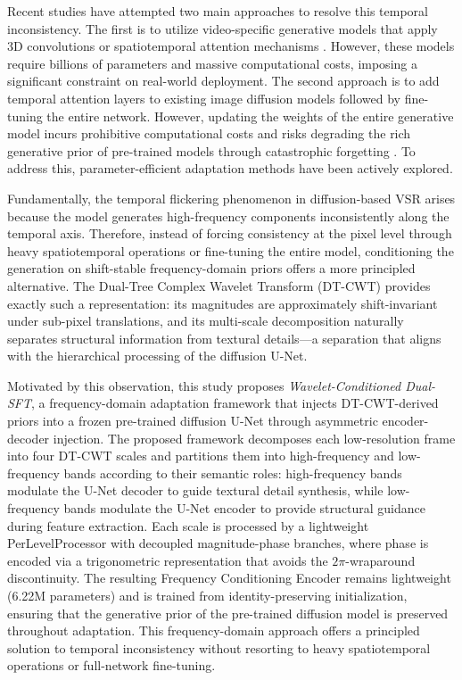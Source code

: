Recent studies have attempted two main approaches to resolve this temporal inconsistency. The first is to utilize video-specific generative models that apply 3D convolutions or spatiotemporal attention mechanisms \cite{blattmann2023svd, zhou2024upscaleavideo}. However, these models require billions of parameters and massive computational costs, imposing a significant constraint on real-world deployment. The second approach is to add temporal attention layers to existing image diffusion models followed by fine-tuning the entire network. However, updating the weights of the entire generative model incurs prohibitive computational costs and risks degrading the rich generative prior of pre-trained models through catastrophic forgetting \cite{zhang2023controlnet}. To address this, parameter-efficient adaptation methods \cite{hu2021lora} have been actively explored.


Fundamentally, the temporal flickering phenomenon in diffusion-based VSR arises because the model generates 
high-frequency components inconsistently along the temporal axis. Therefore, instead of forcing consistency at the pixel level through heavy spatiotemporal operations or fine-tuning the entire model, conditioning the generation on shift-stable frequency-domain priors offers a more principled alternative. The Dual-Tree Complex 
Wavelet Transform (DT-CWT) \cite{selesnick2005dtcwt} provides exactly such a representation: its magnitudes are approximately shift-invariant under sub-pixel translations, and its multi-scale decomposition naturally separates structural information from textural details---a separation that aligns with the hierarchical 
processing of the diffusion U-Net.


Motivated by this observation, this study proposes \emph{Wavelet-Conditioned Dual-SFT}, a frequency-domain adaptation framework that injects DT-CWT-derived priors into a frozen pre-trained diffusion U-Net through asymmetric encoder-decoder injection. The proposed framework decomposes each low-resolution frame into four DT-CWT scales and partitions them into high-frequency and low-frequency bands according to their 
semantic roles: high-frequency bands modulate the U-Net decoder to guide textural detail synthesis, while low-frequency bands modulate the U-Net encoder to provide structural guidance during feature extraction. Each scale is processed by a lightweight PerLevelProcessor with decoupled magnitude-phase branches, where phase is encoded via a trigonometric representation that avoids the $2\pi$-wraparound discontinuity. The resulting Frequency Conditioning Encoder remains lightweight (6.22M parameters) and is trained from identity-preserving initialization, ensuring that the generative prior of the pre-trained diffusion model is preserved throughout adaptation. This frequency-domain approach offers a principled solution to temporal inconsistency without resorting to heavy spatiotemporal operations or full-network fine-tuning.

